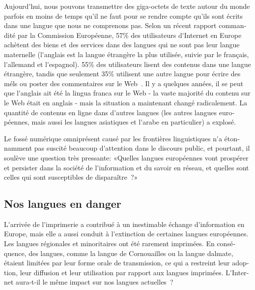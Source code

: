 \documentclass[]{../metanetpaper}
\begin{document}
\begin{french}
\begin{multicols}{2}

Aujourd{\mbox '}hui, nous pouvons transmettre des giga-octets de texte
autour du monde parfois en moins de temps qu'il ne faut pour se rendre
compte qu'ils sont écrits dans une langue que nous ne comprenons pas.
Selon un récent rapport commandité par la Commission Européenne, 57\%
des utilisateurs d{\mbox '}Internet en Europe achètent des biens et
des services dans des langues qui ne sont pas leur langue maternelle
(l{\mbox '}anglais est la langue étrangère la plus utilisée, suivie
par le français, l{\mbox '}allemand et l{\mbox '}espagnol). 55\% des
utilisateurs lisent des contenus dans une langue étrangère, tandis que
seulement 35\% utilisent une autre langue pour écrire des méls ou
poster des commentaires sur le Web~\cite{Eurobarometer313}. Il y a
quelques années, il se peut que l{\mbox '}anglais ait été la lingua
franca sur le Web - la vaste majorité du contenu sur le Web était en
anglais - mais la situation a maintenant changé radicalement. La
quantité de contenus en ligne dans d{\mbox '}autres langues (les
autres langues européennes, mais aussi les langues asiatiques et
l{\mbox '}arabe en particulier) a explosé.


Le fossé numérique omniprésent causé par les frontières linguistiques
n{\mbox '}a étonnamment pas suscité beaucoup d{\mbox '}attention dans
le discours public, et pourtant, il soulève une question très
pressante: «Quelles langues européennes vont prospérer et persister
  dans la société de l{\mbox '}information et du savoir en réseau, et
  quelles sont celles qui sont susceptibles de disparaître~?»

\subsection{Nos langues en danger}

L{\mbox '}arrivée de l{\mbox '}imprimerie a contribué à un inestimable
échange d{\mbox '}information en Europe, mais elle a aussi conduit à
l{\mbox '}extinction de certaines langues européennes. Les langues
régionales et minoritaires ont été rarement imprimées. En conséquence,
des langues, comme la langue de Cornouailles ou la langue dalmate,
étaient limitées par leur forme orale de transmission, ce qui a
restreint leur adoption, leur diffusion et leur utilisation par
rapport aux langues imprimées. L{\mbox '}Internet aura-t-il le même
impact sur nos langues actuelles~?


\end{multicols}
\end{french}
\end{document}
